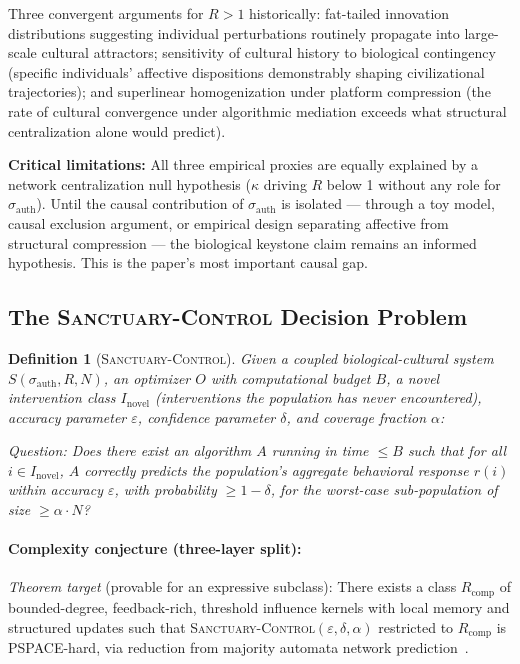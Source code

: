 \documentclass[11pt, a4paper]{article}
\newtheorem{definition}{Definition}[section]
\theoremstyle{remark}
\begin{document}
Three convergent arguments for $R > 1$ historically: fat-tailed innovation distributions suggesting individual perturbations routinely propagate into large-scale cultural attractors; sensitivity of cultural history to biological contingency (specific individuals' affective dispositions demonstrably shaping civilizational trajectories); and superlinear homogenization under platform compression (the rate of cultural convergence under algorithmic mediation exceeds what structural centralization alone would predict).

\textbf{Critical limitations:} All three empirical proxies are equally explained by a network centralization null hypothesis ($\kappa$ driving $R$ below 1 without any role for $\sigma_{\text{auth}}$). Until the causal contribution of $\sigma_{\text{auth}}$ is isolated --- through a toy model, causal exclusion argument, or empirical design separating affective from structural compression --- the biological keystone claim remains an informed hypothesis. This is the paper's most important causal gap.

\subsection{The \texorpdfstring{\textsc{Sanctuary-Control}}{Sanctuary-Control} Decision Problem}\label{sec:sanctuary-control}

\begin{definition}[\textsc{Sanctuary-Control}]
Given a coupled biological-cultural system $S(\sigma_{\text{auth}}, R, N)$, an optimizer $O$ with computational budget $B$, a novel intervention class $I_{\text{novel}}$ (interventions the population has never encountered), accuracy parameter $\varepsilon$, confidence parameter $\delta$, and coverage fraction $\alpha$:

\emph{Question:} Does there exist an algorithm $A$ running in time $\leq B$ such that for all $i \in I_{\text{novel}}$, $A$ correctly predicts the population's aggregate behavioral response $r(i)$ within accuracy $\varepsilon$, with probability $\geq 1-\delta$, for the worst-case sub-population of size $\geq \alpha \cdot N$?
\end{definition}

\paragraph{Complexity conjecture (three-layer split):}

\emph{Theorem target} (provable for an expressive subclass): There exists a class $R_{\text{comp}}$ of bounded-degree, feedback-rich, threshold influence kernels with local memory and structured updates such that \textsc{Sanctuary-Control}$(\varepsilon, \delta, \alpha)$ restricted to $R_{\text{comp}}$ is PSPACE-hard, via reduction from majority automata network prediction~\cite{goles2016}.
\end{document}
